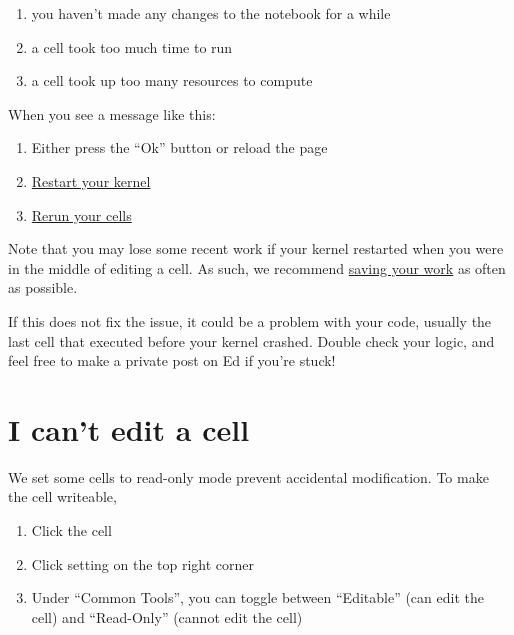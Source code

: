 \documentclass[
  letterpaper,
  DIV=11,
  numbers=noendperiod]{scrreprt}
\providecommand{\tightlist}{%
  \setlength{\itemsep}{0pt}\setlength{\parskip}{0pt}}\usepackage{longtable,booktabs,array}
\begin{document}
\begin{enumerate}
\def\labelenumi{\arabic{enumi}.}
\tightlist
\item
  you haven't made any changes to the notebook for a while
\item
  a cell took too much time to run
\item
  a cell took up too many resources to compute
\end{enumerate}

When you see a message like this:

\begin{enumerate}
\def\labelenumi{\arabic{enumi}.}
\tightlist
\item
  Either press the ``Ok'' button or reload the page
\item
  \href{https://ds100.org/debugging-guide/jupyter101/jupyter101.html\#restarting-kernel}{Restart
  your kernel}
\item
  \href{https://ds100.org/debugging-guide/jupyter101/jupyter101.html\#running-cells}{Rerun
  your cells}
\end{enumerate}

Note that you may lose some recent work if your kernel restarted when
you were in the middle of editing a cell. As such, we recommend
\href{https://ds100.org/debugging-guide/jupyter101/jupyter101.html\#saving-your-notebook}{saving
your work} as often as possible.

If this does not fix the issue, it could be a problem with your code,
usually the last cell that executed before your kernel crashed. Double
check your logic, and feel free to make a private post on Ed if you're
stuck!

\section{I can't edit a cell}\label{i-cant-edit-a-cell}

We set some cells to read-only mode prevent accidental modification. To
make the cell writeable,

\begin{enumerate}
\def\labelenumi{\arabic{enumi}.}
\tightlist
\item
  Click the cell
\item
  Click setting on the top right corner
\item
  Under ``Common Tools'', you can toggle between ``Editable'' (can edit
  the cell) and ``Read-Only'' (cannot edit the cell)
\end{enumerate}
\end{document}
